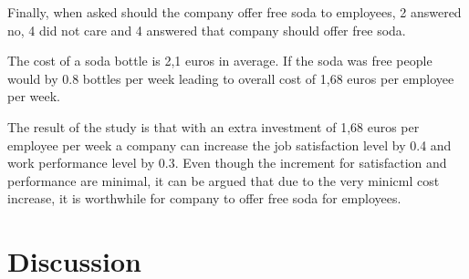 \documentclass[a4paper]{article}
\begin{document}
Finally, when asked should the company offer free soda to employees, 2 answered no, 4 did not care and 4 answered that company should offer free soda.

The cost of a soda bottle is 2,1 euros in average. If the soda was free people would by 0.8 bottles per week leading to overall cost of 1,68 euros per employee per week.

The result of the study is that with an extra investment of 1,68 euros per employee per week a company can increase the job satisfaction level by 0.4 and work performance level by 0.3. Even though the increment for satisfaction and performance are minimal, it can be argued that due to the very minicml cost increase, it is worthwhile for company to offer free soda for employees.

\begin{comment}
What is the answer to the research question? 
What are the answers to the sub-questions? 
Keep this simple and clear.
\end{comment}

\section{Discussion}



\begin{comment}
How could someone criticize your results? 
Are they internally valid (the data was gathered and analyzed correctly)? 
Are the results externally valid (can they be generalized and how)? 
Based on the results, what can you say about the bigger picture you described in your introduction? 
How could someone apply your results for further research? 
Or perhaps apply in a non-research context (e.g., in a company or in everyday life)?
\end{comment}




\end{document}

